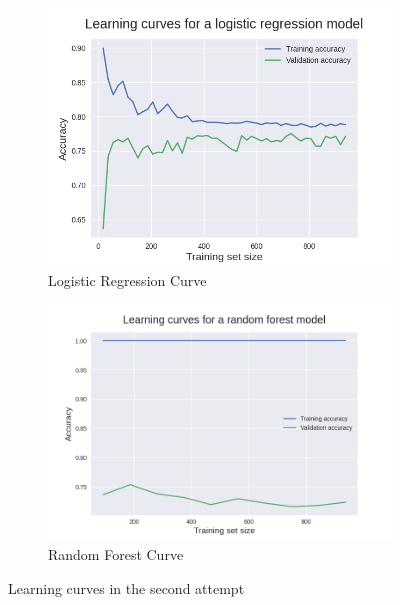 \documentclass[10pt, conference]{IEEEtran}
\begin{document}
\begin{figure}[t]
    \centering
    \begin{subfigure}[b]{.5\linewidth}
        \centering
        \includegraphics[width=\linewidth]{resources/learning_curve_in-out_features_log_regr.png}
        \caption{Logistic Regression Curve}
        \label{fig:learning-curves-second-attempt-randfor}
    \end{subfigure}%
    \begin{subfigure}[b]{.5\linewidth}
        \centering
        \includegraphics[width=\linewidth]{resources/learning_curve_in-out_features_rand_for.png}
        \caption{Random Forest Curve}
        \label{fig:learning-curves-second-attempt-logreg}
    \end{subfigure}
    \caption{Learning curves in the second attempt}
    \label{fig:learning-curves-second-attempt}
\end{figure}
\end{document}
